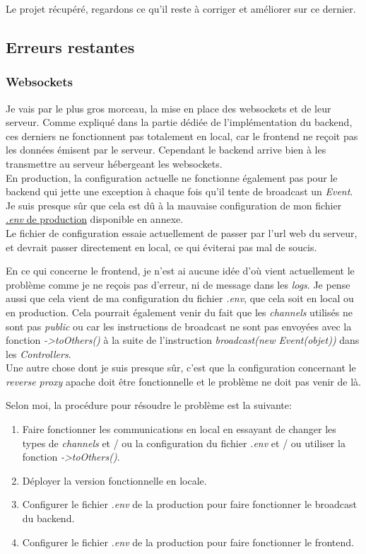 \documentclass[
    iai, %
    il, %
]{heig-tb}
\begin{document}
Le projet récupéré, regardons ce qu'il reste à corriger et améliorer sur ce dernier.

\subsection{Erreurs restantes}

\subsubsection{Websockets}
Je vais par le plus gros morceau, la mise en place des \Gls{websockets} et de leur serveur.
Comme expliqué dans la partie dédiée de l'implémentation du \Gls{backend}, ces derniers ne fonctionnent pas totalement en local, car le \Gls{frontend} ne reçoit pas les données émisent par le serveur. Cependant le \Gls{backend} arrive bien à les transmettre au serveur hébergeant les \Gls{websockets}. \\
En production, la configuration actuelle ne fonctionne également pas pour le \Gls{backend} qui jette une exception à chaque fois qu'il tente de \Gls{broadcast} un \emph{Event}. Je suis presque sûr que cela est dû à la mauvaise configuration de mon fichier \href{https://github.com/heig-fablab/fablab-manager/blob/main/.env.prod.example}{\emph{.env} de production} disponible en annexe. \\
Le fichier de configuration essaie actuellement de passer par l'url web du serveur, et devrait passer directement en local, ce qui éviterai pas mal de soucis.

En ce qui concerne le frontend, je n'est ai aucune idée d'où vient actuellement le problème comme je ne reçois pas d'erreur, ni de message dans les \emph{logs}. Je pense aussi que cela vient de ma configuration du fichier \emph{.env}, que cela soit en local ou en production.
Cela pourrait également venir du fait que les \emph{channels} utilisés ne sont pas \emph{public} ou car les instructions de \Gls{broadcast} ne sont pas envoyées avec la fonction \emph{->toOthers()} à la suite de l'instruction \emph{broadcast(new Event(objet))} dans les \emph{Controllers}. \\

Une autre chose dont je suis presque sûr, c'est que la configuration concernant le \emph{reverse proxy} \Gls{apache} doit être fonctionnelle et le problème ne doit pas venir de là.

Selon moi, la procédure pour résoudre le problème est la suivante:
\begin{enumerate}
    \item Faire fonctionner les communications en local en essayant de changer les types de \emph{channels} et / ou la configuration du fichier \emph{.env} et / ou utiliser la fonction \emph{->toOthers()}.
    \item Déployer la version fonctionnelle en locale.
    \item Configurer le fichier \emph{.env} de la production pour faire fonctionner le \Gls{broadcast} du \Gls{backend}.
    \item Configurer le fichier \emph{.env} de la production pour faire fonctionner le \Gls{frontend}.
\end{enumerate}
\end{document}
